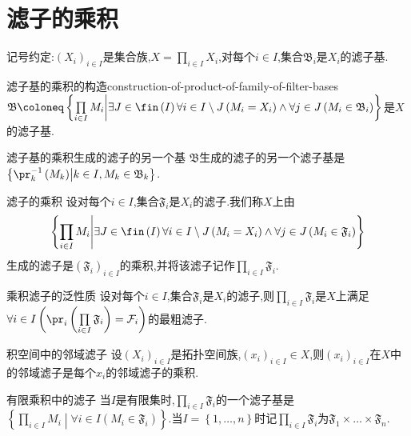 \section{滤子的乘积}

记号约定:$\left(X_{i}\right)_{i\in I}$是集合族,$X=\prod\limits_{i\in I}X_{i}$,对每个$i\in I$,集合$\mathfrak{B}_{i}$是$X_{i}$的滤子基.

\begin{proposition}{滤子基的乘积的构造}{construction-of-product-of-family-of-filter-bases}
	$\mathfrak{B}\coloneq\left\{\prod\limits_{i\in I}M_{i}\middle|\exists J\in\fin\left(I\right)\forall i\in I\setminus J\left(M_{i}=X_{i}\right)\wedge\forall j\in J\left(M_{i}\in\mathfrak{B}_{i}\right)\right\}$是$X$的滤子基.
\end{proposition}

\begin{remark}{滤子基的乘积生成的滤子的另一个基}{}
	$\mathfrak{B}$生成的滤子的另一个滤子基是$\left\{\pr_{k}^{-1}\left(M_{k}\right)\middle|k\in I,M_{k}\in\mathfrak{B}_{k}\right\}$.
\end{remark}

\begin{definition}{滤子的乘积}{}
	设对每个$i\in I$,集合$\mathfrak{F}_{i}$是$X_{i}$的滤子.我们称$X$上由
	\begin{align*}
		\left\{\prod\limits_{i\in I}M_{i}\middle|\exists J\in\fin\left(I\right)\forall i\in I\setminus J\left(M_{i}=X_{i}\right)\wedge\forall j\in J\left(M_{i}\in\mathfrak{F}_{i}\right)\right\}
	\end{align*}
	生成的滤子是$\left(\mathfrak{F}_{i}\right)_{i\in I}$的乘积,并将该滤子记作$\prod\limits_{i\in I}\mathfrak{F}_{i}$.
\end{definition}

\begin{proposition}{乘积滤子的泛性质}{}
	设对每个$i\in I$,集合$\mathfrak{F}_{i}$是$X_{i}$的滤子,则$\prod\limits_{i\in I}\mathfrak{F}_{i}$是$X$上满足$\forall i\in I\left(\pr_{i}\left(\prod\limits_{i\in I}\mathfrak{F}_{i}\right)=\mathcal{F}_{i}\right)$的最粗滤子.
\end{proposition}

\begin{example}{积空间中的邻域滤子}{}
	设$\left(X_{i}\right)_{i\in I}$是拓扑空间族,$\left(x_{i}\right)_{i\in I}\in X$,则$\left(x_{i}\right)_{i\in I}$在$X$中的邻域滤子是每个$x_{i}$的邻域滤子的乘积.
\end{example}

\begin{remark}{有限乘积中的滤子}{}
	当$I$是有限集时,$\prod\limits_{i\in I}\mathfrak{F}_{i}$的一个滤子基是$\left\{\prod\limits_{i\in I}M_{i}\middle|\forall i\in I\left(M_{i}\in\mathfrak{F}_{i}\right)\right\}$.当$I=\left\{1,\ldots,n\right\}$时记$\prod\limits_{i\in I}\mathfrak{F}_{i}$为$\mathfrak{F}_{1}\times\ldots\times\mathfrak{F}_{n}$.
\end{remark}



